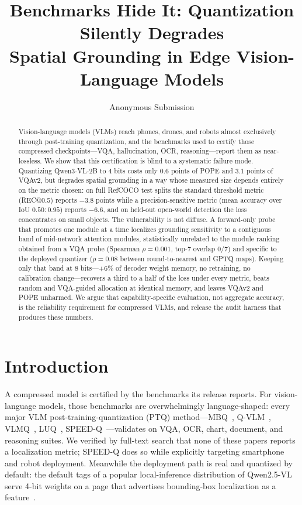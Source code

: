 \documentclass[letterpaper]{article} %
\title{Benchmarks Hide It: Quantization Silently Degrades\\Spatial Grounding in Edge Vision-Language Models}
\author{Anonymous Submission}
\begin{document}
\maketitle

\begin{abstract}
Vision-language models (VLMs) reach phones, drones, and robots almost exclusively through post-training quantization, and the benchmarks used to certify those compressed checkpoints---VQA, hallucination, OCR, reasoning---report them as near-lossless. We show that this certification is blind to a systematic failure mode. Quantizing Qwen3-VL-2B to 4 bits costs only $0.6$ points of POPE and $3.1$ points of VQAv2, but degrades spatial grounding in a way whose measured size depends entirely on the metric chosen: on full RefCOCO test splits the standard threshold metric (REC@0.5) reports $-3.8$ points while a precision-sensitive metric (mean accuracy over IoU $0.50{:}0.95$) reports $-6.6$, and on held-out open-world detection the loss concentrates on small objects. The vulnerability is not diffuse. A forward-only probe that promotes one module at a time localizes grounding sensitivity to a contiguous band of mid-network attention modules, statistically unrelated to the module ranking obtained from a VQA probe (Spearman $\rho = 0.001$, top-7 overlap $0/7$) and specific to the deployed quantizer ($\rho = 0.08$ between round-to-nearest and GPTQ maps). Keeping only that band at 8 bits---$+6\%$ of decoder weight memory, no retraining, no calibration change---recovers a third to a half of the loss under every metric, beats random and VQA-guided allocation at identical memory, and leaves VQAv2 and POPE unharmed. We argue that capability-specific evaluation, not aggregate accuracy, is the reliability requirement for compressed VLMs, and release the audit harness that produces these numbers.
\end{abstract}

\section{Introduction}

A compressed model is certified by the benchmarks its release reports. For vision-language models, those benchmarks are overwhelmingly language-shaped: every major VLM post-training-quantization (PTQ) method---MBQ~\cite{mbq}, Q-VLM~\cite{qvlm}, VLMQ~\cite{vlmq}, LUQ~\cite{luq}, SPEED-Q~\cite{speedq}---validates on VQA, OCR, chart, document, and reasoning suites. We verified by full-text search that none of these papers reports a localization metric; SPEED-Q does so while explicitly targeting smartphone and robot deployment. Meanwhile the deployment path is real and quantized by default: the default tags of a popular local-inference distribution of Qwen2.5-VL serve 4-bit weights on a page that advertises bounding-box localization as a feature~\cite{ollamaqwen}.
\end{document}
